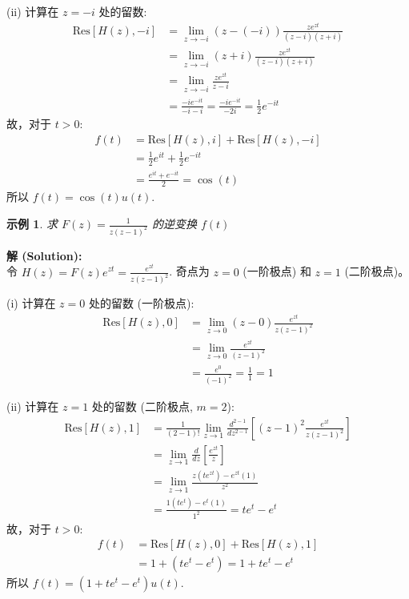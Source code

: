 \documentclass[linespread=1.5,openany]{book}%
\def\diff{d}%
\theoremstyle{plain}
\newtheorem{example}[theorem]{示例}
\newcommand{\diff}{\mathop{}\!\mathrm{d}}  %
\begin{document}
{{{{{{{									(ii) 计算在 $z=-i$ 处的留数:
									\begin{align*}
										\text{Res}[H(z), -i] &= \lim_{z\to -i} (z-(-i)) \frac{z e^{zt}}{(z-i)(z+i)} \\[6pt]
										&= \lim_{z\to -i} (z+i) \frac{z e^{zt}}{(z-i)(z+i)} \\[6pt]
										&= \lim_{z\to -i} \frac{z e^{zt}}{z-i} \\[6pt]
										&= \frac{-i e^{-it}}{-i-i} = \frac{-i e^{-it}}{-2i} = \frac{1}{2}e^{-it}
									\end{align*}
									故，对于 $t>0$:
									\begin{align*}
										f(t) &= \text{Res}[H(z), i] + \text{Res}[H(z), -i] \\[6pt]
										&= \frac{1}{2}e^{it} + \frac{1}{2}e^{-it} \\[6pt]
										&= \frac{e^{it} + e^{-it}}{2} = \cos(t)
									\end{align*}
									所以 $f(t) = \cos(t) u(t)$.
									\vspace{\baselineskip}
									
									\begin{example}求 $F(z) = \frac{1}{z(z-1)^2}$ 的逆变换 $f(t)$ \label{ex:L16_inv_laplace_ex2}
									\end{example}
									\noindent\textbf{解 (Solution):} \\
									令 $H(z) = F(z)e^{zt} = \frac{e^{zt}}{z(z-1)^2}$.
									奇点为 $z=0$ (一阶极点) 和 $z=1$ (二阶极点)。
									
									(i) 计算在 $z=0$ 处的留数 (一阶极点):
									\begin{align*}
										\text{Res}[H(z), 0] &= \lim_{z\to 0} (z-0) \frac{e^{zt}}{z(z-1)^2} \\[6pt]
										&= \lim_{z\to 0} \frac{e^{zt}}{(z-1)^2} \\[6pt]
										&= \frac{e^0}{(-1)^2} = \frac{1}{1} = 1
									\end{align*}
									
									(ii) 计算在 $z=1$ 处的留数 (二阶极点, $m=2$):
									\begin{align*}
										\text{Res}[H(z), 1] &= \frac{1}{(2-1)!} \lim_{z\to 1} \frac{\diff^{2-1}}{\diff z^{2-1}} \left[ (z-1)^2 \frac{e^{zt}}{z(z-1)^2} \right] \\[6pt]
										&= \lim_{z\to 1} \frac{\diff}{\diff z} \left[ \frac{e^{zt}}{z} \right] \\
										&= \lim_{z\to 1} \frac{z(te^{zt}) - e^{zt}(1)}{z^2} \\[6pt]
										&= \frac{1(te^{t}) - e^{t}(1)}{1^2} = te^t - e^t
									\end{align*}
									故，对于 $t>0$:
									\begin{align*}
										f(t) &= \text{Res}[H(z), 0] + \text{Res}[H(z), 1] \\[6pt]
										&= 1 + (te^t - e^t) = 1 + te^t - e^t
									\end{align*}
									所以 $f(t) = (1 + te^t - e^t)u(t)$.
									\vspace{\baselineskip}
									
}}}}}}}
\end{document}
